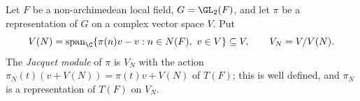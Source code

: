 Let $F$ be a non-archimedean local field, $G=\GL_2(F)$, and let $\pi$ be a representation of $G$ on a complex vector
space $V$. Put
\[
  V(N)=\operatorname{span}_\C\{\pi(n)v-v:n\in N(F),\ v\in V\}\subseteq V,\qquad V_N=V/V(N).
\]
The \emph{Jacquet module} of $\pi$ is $V_N$ with the action $\pi_N(t)(v+V(N))=\pi(t)v+V(N)$ of $T(F)$; this is well
defined, and $\pi_N$ is a representation of $T(F)$ on $V_N$.
